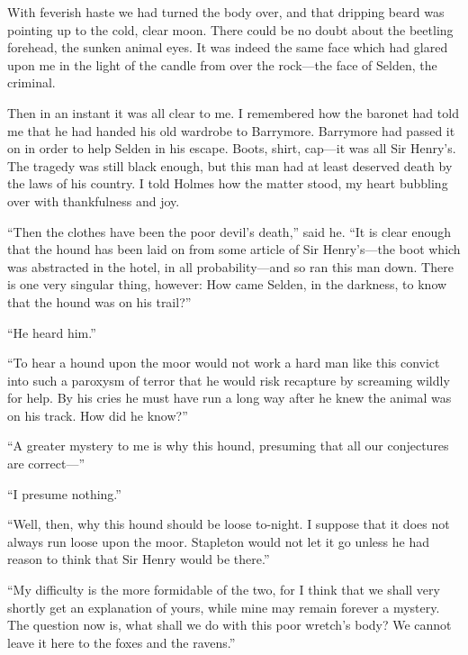 \documentclass[paper=5.5in:8.5in,BCOR=7mm,twoside,DIV=calc,12pt,usegeometry,openany,chapterprefix,endperiod,headings=big]{scrbook} %
\begin{document}
With feverish haste we had turned the body over, and that dripping beard was pointing up to the cold, clear moon. There could be no doubt about the beetling forehead, the sunken animal eyes. It was indeed the same face which had glared upon me in the light of the candle from over the rock---the face of Selden, the criminal.


Then in an instant it was all clear to me. I remembered how the baronet had told me that he had handed his old wardrobe to Barrymore. Barrymore had passed it on in order to help Selden in his escape. Boots, shirt, cap---it was all Sir Henry's. The tragedy was still black enough, but this man had at least deserved death by the laws of his country. I told Holmes how the matter stood, my heart bubbling over with thankfulness and joy.

\enquote{Then the clothes have been the poor devil's death,} said he. \enquote{It is clear enough that the hound has been laid on from some article of Sir Henry's---the boot which was abstracted in the hotel, in all probability---and so ran this man down. There is one very singular thing, however: How came Selden, in the darkness, to know that the hound was on his trail?}

\enquote{He heard him.}

\enquote{To hear a hound upon the moor would not work a hard man like this convict into such a paroxysm of terror that he would risk recapture by screaming wildly for help. By his cries he must have run a long way after he knew the animal was on his track. How did he know?}

\enquote{A greater mystery to me is why this hound, presuming that all our conjectures are correct---}

\enquote{I presume nothing.}

\enquote{Well, then, why this hound should be loose to-night. I suppose that it does not always run loose upon the moor. Stapleton would not let it go unless he had reason to think that Sir Henry would be there.}

\enquote{My difficulty is the more formidable of the two, for I think that we shall very shortly get an explanation of yours, while mine may remain forever a mystery. The question now is, what shall we do with this poor wretch's body? We cannot leave it here to the foxes and the ravens.}
\end{document}
